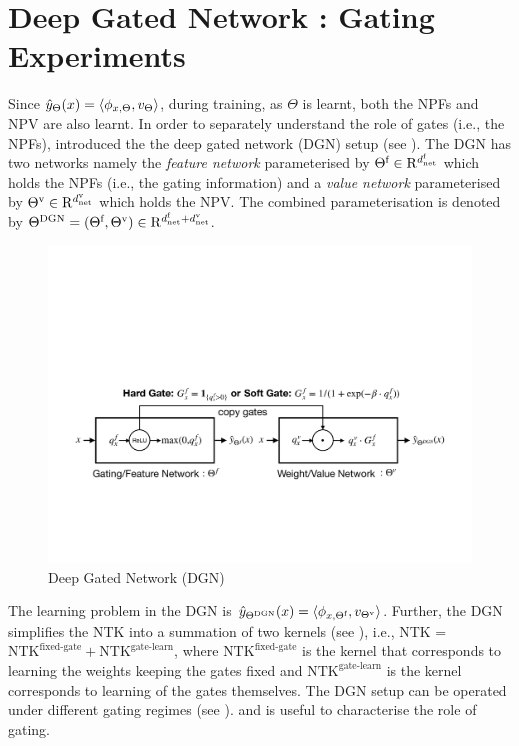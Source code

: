 \section{Deep Gated Network : Gating Experiments}\label{sec:dgn}
Since $\hat{y}_{\Theta}(x)=\langle \phi_{x,\Theta},v_{\Theta}\rangle$, during training, as $\Theta$ is learnt, both the NPFs and NPV are also learnt. In order to separately understand the role of gates (i.e., the NPFs),  \cite{npk} introduced the the deep gated network (DGN) setup (see ).  The DGN has two networks namely the \emph{feature network} parameterised by $\Theta^{\textrm{f}}\in\mathrm{R}^{d^{\text{f}}_{\text{net}}}$ which holds the NPFs (i.e., the gating information) and a \emph{value network} parameterised by ${\Theta}^{\text{v}}\in\mathrm{R}^{d^{\text{v}}_{\text{net}}}$ which holds the NPV.  The combined parameterisation is denoted by $\Theta^{\text{DGN}}=(\Theta^{\textrm{f}},{\Theta}^{\text{v}})\in \mathrm{R}^{d^{\text{f}}_{\text{net}}+d^{\text{v}}_{\text{net}}}$.  
\FloatBarrier
\begin{figure}[h]

\includegraphics[scale=0.3]{figs/dgn-simple.pdf}

\caption{Deep Gated Network (DGN)}
\label{fig:dgn}
\end{figure}
The learning problem in the DGN is $\hat{y}_{\Theta^{\text{DGN}}}(x)=\langle \phi_{x,\Theta^{\textrm{f}}},v_{{\Theta}^{\text{v}}}\rangle$. Further, the DGN simplifies the NTK into a summation of two kernels (see ), i.e., NTK = $\text{NTK}^{\text{fixed-gate}}+ \text{NTK}^\text{gate-learn}$, where $\text{NTK}^{\text{fixed-gate}}$ is the kernel that corresponds to learning the weights keeping the gates fixed and $\text{NTK}^\text{gate-learn}$ is the kernel corresponds to learning of the gates themselves. The DGN setup can be operated under different gating regimes (see ). and is useful to characterise the role of gating.

